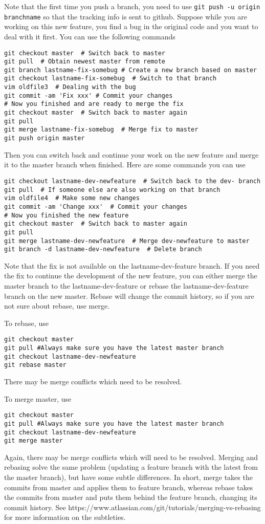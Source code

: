 \documentclass[runningheads,letterpaper]{llncs}
\begin{document}
Note that the first time you push a branch, you need to use {\tt git push -u origin branchname} so
that the tracking info is sent to github.
Suppose while you are working on this new feature, you find a bug in the original code and you want to deal with it first. You can use the following commands
\begin{verbatim}
git checkout master  # Switch back to master
git pull  # Obtain newest master from remote
git branch lastname-fix-somebug # Create a new branch based on master
git checkout lastname-fix-somebug  # Switch to that branch
vim oldfile3  # Dealing with the bug
git commit -am 'Fix xxx' # Commit your changes
# Now you finished and are ready to merge the fix
git checkout master  # Switch back to master again
git pull
git merge lastname-fix-somebug  # Merge fix to master
git push origin master
\end{verbatim}

Then you can switch back and continue your work on the new feature and merge it to the master branch when finished.
Here are some commands you can use
\begin{verbatim}
git checkout lastname-dev-newfeature  # Switch back to the dev- branch
git pull  # If someone else are also working on that branch
vim oldfile4  # Make some new changes
git commit -am 'Change xxx'  # Commit your changes
# Now you finished the new feature
git checkout master  # Switch back to master again
git pull
git merge lastname-dev-newfeature  # Merge dev-newfeature to master
git branch -d lastname-dev-newfeature  # Delete branch
\end{verbatim}

Note that the fix is not available on the lastname-dev-feature branch.
If you need the fix to continue the development of the new feature, you can either merge the master branch to the lastname-dev-feature or rebase the lastname-dev-feature branch on the new master.
Rebase will change the commit history, so if you are not sure about rebase, use merge.

To rebase, use
\begin{verbatim}
git checkout master
git pull #Always make sure you have the latest master branch
git checkout lastname-dev-newfeature
git rebase master
\end{verbatim}
There may be merge conflicts which need to be resolved.

To merge master, use
\begin{verbatim}
git checkout master
git pull #Always make sure you have the latest master branch
git checkout lastname-dev-newfeature
git merge master
\end{verbatim}
Again, there may be merge conflicts which will need to be resolved. Merging and rebasing
solve the same problem (updating a feature branch with the latest from the master branch),
but have some subtle differences. In short, merge takes the commits from master 
and applies them to feature branch, whereas rebase takes the commits from master and puts 
them behind the feature branch, changing its commit history. See 
https://www.atlassian.com/git/tutorials/merging-vs-rebasing for more information on the
subtleties.
\end{document}
